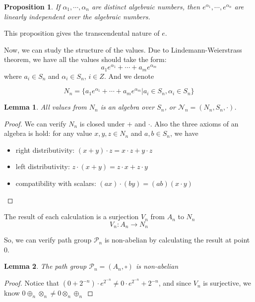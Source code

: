 \documentclass{article}
\newtheorem{lemma}{Lemma}
\newtheorem{proposition}{Proposition}
\begin{document}
\begin{proposition}
\label{proposition:LindemannWeierstrass}
If $\alpha_1, \cdots, \alpha_n$ are distinct algebraic numbers, then $e^{\alpha_1}, \cdots, e^{\alpha_n}$ are linearly independent over the algebraic numbers.
\end{proposition}

This proposition gives the transcendental nature of $e$.

Now, we can study the structure of the values.
Due to Lindemann-Weierstrass theorem, we have all the values should take the form:
$$
a_1 e^{\alpha_1} + \cdots + a_m e^{\alpha_m}
$$
where $a_i \in S_n$ and $\alpha_i \in S_n$, $i \in Z$. And we denote

$$
N_n = \{ a_1 e^{\alpha_1} + \cdots + a_m e^{\alpha_m} | a_i \in S_n, \alpha_i \in S_n \}
$$

\begin{lemma}
\label{lemma:valuealgebra}
All values from $N_n$ is an algebra over $S_n$, or $\mathcal{N}_n = (N_n, S_n, \cdot)$.
\end{lemma}

\begin{proof}
We can verify $N_n$ is closed under $+$ and $\cdot$. Also the three axioms of an algebra is hold:
for any value $x, y, z \in N_n$ and $a, b \in S_n$, we have
\begin{itemize}
    \item right distributivity: $(x + y) \cdot z = x \cdot z + y \cdot z$
    \item left distributivity: $z \cdot (x + y) = z \cdot x + z \cdot y$
    \item compatibility with scalars: $(ax) \cdot (by) = (ab) (x \cdot y)$
\end{itemize}
\qedhere
\end{proof}

The result of each calculation is a surjection $V_n$ from $A_n$ to $N_n$
$$ V_n: A_n \to N_n $$

So, we can verify path group $\mathcal{P}_n$ is non-abelian by calculating the result at point $0$.

\begin{lemma}
\label{lemma:nonabelian}
The path group $\mathcal{P}_n = (A_n, \circ)$ is non-abelian
\end{lemma}

\begin{proof}
Notice that $(0 + 2^{-n}) \cdot e^{2^{-n}} \neq 0 \cdot e^{2^{-n}} + 2^{-n}$, and since $V_n$ is surjective, we know $0 \oplus_n \otimes_n \neq 0 \otimes_n \oplus_n$
\qedhere
\end{proof}
\end{document}
